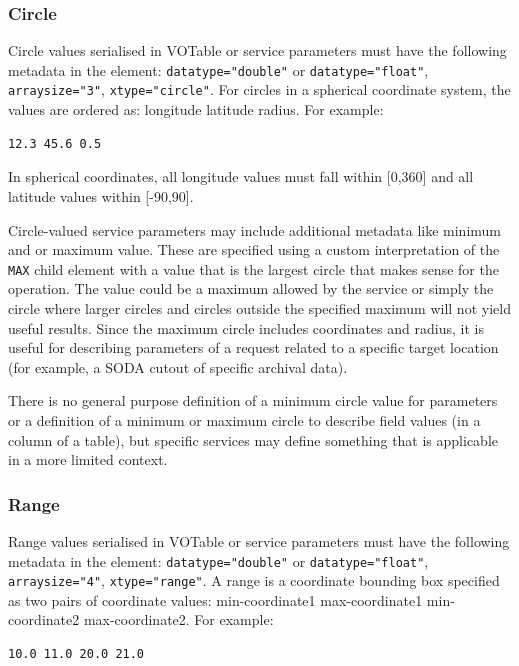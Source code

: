 \documentclass[11pt,letter]{ivoa}
\begin{document}
\subsubsection{Circle}
Circle values serialised in VOTable or service parameters must have the following metadata in the 
 element: \verb|datatype="double"| or \verb|datatype="float"|, \verb|arraysize="3"|,
\verb|xtype="circle"|. For circles 
in a spherical coordinate system, the values are ordered as: longitude latitude 
radius. For example:

\begin{verbatim}
12.3 45.6 0.5
\end{verbatim}

In spherical coordinates, all longitude values must fall within [0,360] and all 
latitude values within [-90,90].

Circle-valued service parameters may include additional metadata like minimum and
or maximum value. These are specified using a custom interpretation of the
\verb|MAX| child element with a value that is the largest circle that makes sense
for the operation. The value could be a maximum allowed by the service or simply
the circle where larger circles and circles outside the specified maximum will not
yield useful results. Since the maximum circle includes coordinates and radius,
it is useful for describing parameters of a request related to a specific target
location (for example, a SODA cutout of specific archival data).

There is no general purpose definition of a minimum circle value for parameters or
a definition of a minimum or maximum circle to describe field values (in a column
of a table), but specific services may define something that is applicable in a
more limited context.

\subsubsection{Range}
Range values serialised in VOTable or service parameters must have the following
metadata in the  element: \verb|datatype="double"| or \verb|datatype="float"|,
\verb|arraysize="4"|, \verb|xtype="range"|. A range is a coordinate bounding box specified
as two pairs of coordinate values: min-coordinate1 max-coordinate1 min-coordinate2 max-coordinate2.
For example:

\begin{verbatim}
10.0 11.0 20.0 21.0
\end{verbatim}
\end{document}
